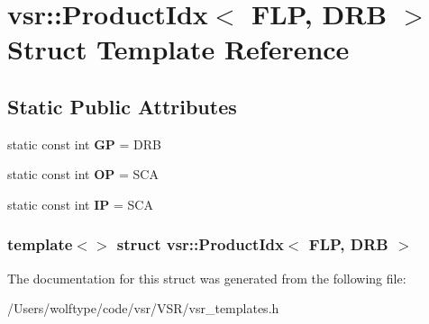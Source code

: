 \hypertarget{structvsr_1_1_product_idx_3_01_f_l_p_00_01_d_r_b_01_4}{\section{vsr\-:\-:Product\-Idx$<$ F\-L\-P, D\-R\-B $>$ Struct Template Reference}
\label{structvsr_1_1_product_idx_3_01_f_l_p_00_01_d_r_b_01_4}
}
\subsection*{Static Public Attributes}
\begin{DoxyCompactItemize}
\item 
\hypertarget{structvsr_1_1_product_idx_3_01_f_l_p_00_01_d_r_b_01_4_a15ad7f6e5d8b8f96260ab55a09cbb7c9}{static const int {\bfseries G\-P} = D\-R\-B}\label{structvsr_1_1_product_idx_3_01_f_l_p_00_01_d_r_b_01_4_a15ad7f6e5d8b8f96260ab55a09cbb7c9}

\item 
\hypertarget{structvsr_1_1_product_idx_3_01_f_l_p_00_01_d_r_b_01_4_acec03ac82bc9e63f121f8dce7cdbdf7d}{static const int {\bfseries O\-P} = S\-C\-A}\label{structvsr_1_1_product_idx_3_01_f_l_p_00_01_d_r_b_01_4_acec03ac82bc9e63f121f8dce7cdbdf7d}

\item 
\hypertarget{structvsr_1_1_product_idx_3_01_f_l_p_00_01_d_r_b_01_4_a33892972b905c9ed2ed090d85a701541}{static const int {\bfseries I\-P} = S\-C\-A}\label{structvsr_1_1_product_idx_3_01_f_l_p_00_01_d_r_b_01_4_a33892972b905c9ed2ed090d85a701541}

\end{DoxyCompactItemize}
\subsubsection*{template$<$$>$ struct vsr\-::\-Product\-Idx$<$ F\-L\-P, D\-R\-B $>$}



The documentation for this struct was generated from the following file\-:\begin{DoxyCompactItemize}
\item 
/\-Users/wolftype/code/vsr/\-V\-S\-R/vsr\-\_\-templates.\-h\end{DoxyCompactItemize}
